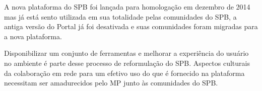 A nova plataforma do SPB foi lançada para homologação em dezembro de 2014 mas já
está sento utilizada em sua totalidade pelas comunidades do SPB, a antiga versão do Portal 
já foi desativada e suas comunidades foram migradas para a nova plataforma. 

Disponibilizar um conjunto de ferramentas e melhorar a experiência do usuário no 
ambiente é parte desse processo de reformulação do SPB. Aspectos culturais 
da colaboração em rede para um efetivo uso do que é fornecido na plataforma 
necessitam ser amadurecidos pelo MP junto às comunidades do SPB.







